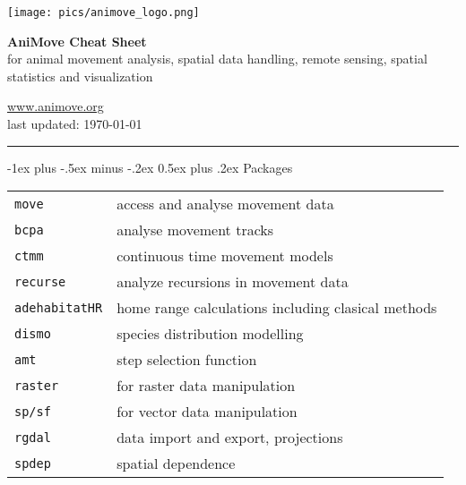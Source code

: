 \documentclass[a4paper,10pt,landscape]{article}
\makeatletter
\renewcommand{\section}{\@startsection{section}{1}{0mm}%
                                {-1ex plus -.5ex minus -.2ex}%
                                {0.5ex plus .2ex}%
                                {\normalfont\large\bfseries}}
\makeatother
\begin{document}
\newlength{\MyLen}


\raggedright
\footnotesize
\begin{multicols}{3}


\setlength{\premulticols}{1pt}
\setlength{\postmulticols}{1pt}
\setlength{\multicolsep}{1pt}
\setlength{\columnsep}{2pt}
  
\begin{center}
	 \texttt{[image: pics/animove\_logo.png]}
     
     \Large{\textbf{AniMove Cheat Sheet}} \\
     for animal movement analysis, spatial data handling, remote sensing, spatial statistics and visualization
     
\end{center}



\url{www.animove.org}\\
last updated: \today

\rule{0.32\textwidth}{0.4pt}


\section{Packages}
\begin{tabular}{@{}p{\the\MyLen}%
		@{}p{\linewidth-\the\MyLen}@{}}
\verb!move!  & access and analyse movement data\\
\verb!bcpa!  & analyse movement tracks\\
\verb!ctmm!  &  continuous time movement models\\
\verb!recurse!  & analyze recursions in movement data\\
\verb!adehabitatHR! & home range calculations including clasical methods\\
\verb!dismo!  &  species distribution modelling \\
\verb!amt!  &  step selection function \\
\verb!raster!    & for raster data manipulation \\
\verb!sp/sf!     & for vector data manipulation \\
\verb!rgdal!  & data import and export, projections \\
\verb!spdep!  & spatial dependence \\


\end{tabular}
\end{multicols}
\end{document}
